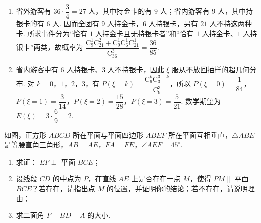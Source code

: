 \begin{solution}
\begin{enumerate}
\item 省外游客有 \(36\cdot\dfrac34=27\) 人，其中持金卡的有 \(9\) 人；省内游客有 \(9\) 人，其中持银卡的有 \(6\) 人. 因而全团有 \(9\) 人持金卡，\(6\) 人持银卡，另有 \(21\) 人不持这两种卡. 所求事件分为“恰有 \(1\) 人持金卡且无持银卡者”和“恰有 \(1\) 人持金卡、\(1\) 人持银卡”两类，故概率为 \(\dfrac{\mathrm C_9^1\mathrm C_{21}^2+\mathrm C_9^1\mathrm C_6^1\mathrm C_{21}^1}{\mathrm C_{36}^3}=\dfrac{36}{85}\).
\item 省内游客中有 \(6\) 人持银卡、\(3\) 人不持银卡，因此 \(\xi\) 服从不放回抽样的超几何分布. 对 \(k=0\)，\(1\)，\(2\)，\(3\)，有 \(P(\xi=k)=\dfrac{\mathrm C_6^k\mathrm C_3^{3-k}}{\mathrm C_9^3}\)，所以 \(P(\xi=0)=\dfrac1{84}\)，\(P(\xi=1)=\dfrac3{14}\)，\(P(\xi=2)=\dfrac{15}{28}\)，\(P(\xi=3)=\dfrac5{21}\). 数学期望为 \(E(\xi)=3\cdot\dfrac69=2\).
\end{enumerate}
\end{solution}

\begin{problem}
如图，正方形 \(ABCD\) 所在平面与平面四边形 \(ABEF\) 所在平面互相垂直，\(\triangle ABE\) 是等腰直角三角形，\(AB = AE\)，\(FA = FE\)，\(\angle AEF = 45^{\circ}\).

\begin{enumerate}
\item 求证： \(EF \perp\) 平面 \(BCE\)；
\item 设线段 \(CD\) 的中点为 \(P\)，在直线 \(AE\) 上是否存在一点 \(M\)，使得 \(PM \parallel\) 平面 \(BCE\)？若存在，请指出点 \(M\) 的位置，并证明你的结论；若不存在，请说明理由；
\item 求二面角 \(F - BD - A\) 的大小.
\end{enumerate}

\end{problem}

